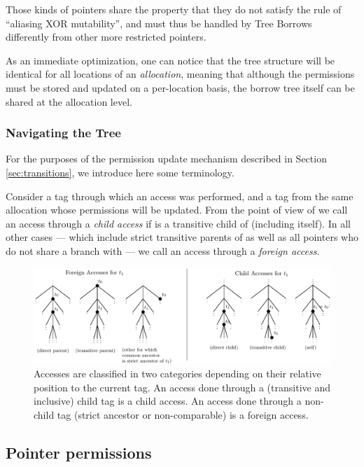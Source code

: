 \documentclass[a4paper,11pt]{article}
\theoremstyle{plain}
\theoremstyle{definition}
\theoremstyle{remark}
\newcommand{\tcode}[1]{\rstinline{#1}}
\begin{document}
Those kinds of pointers share the property that they do not satisfy the rule
of ``aliasing XOR mutability'', and must thus be handled by Tree Borrows differently
from other more restricted pointers.

As an immediate optimization, one can notice that the tree structure will
be identical for all locations of an \textit{allocation}, meaning that although
the permissions must be stored and updated on a per-location basis, the
borrow tree itself can be shared at the allocation level.

\subsubsection{Navigating the Tree}

For the purposes of the permission update mechanism described in Section \ref{sec:transitions},
we introduce here some terminology.

Consider a tag \tcode{t0} through which an access was performed, and a tag
\tcode{t1} from the same allocation whose permissions will be updated. From the point
of view of \tcode{t1} we call an access through \tcode{t0} a \textit{child access}
if \tcode{t0} is a transitive child of \tcode{t1} (including \tcode{t1} itself).
In all other cases --- which include strict transitive parents of \tcode{t1} as well as
all pointers who do not share a branch with \tcode{t1} --- we call an access through
\tcode{t0} a \textit{foreign access}.

\begin{figure}
    \includegraphics[width=\textwidth]{../figs/accesses-kinds.pdf}
    \caption{Accesses are classified in two categories depending on their relative position
    to the current tag. An access done through a (transitive and inclusive) child tag is a child access.
    An access done through a non-child tag (strict ancestor or non-comparable) is a foreign access.}
    \label{fig:kinds-of-accesses}
\end{figure}


\subsection{Pointer permissions}
\end{document}
